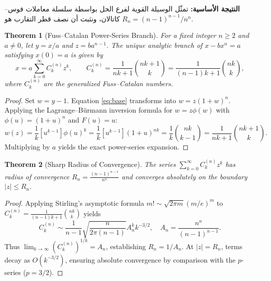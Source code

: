 \documentclass[11pt,a4paper]{article}
\newtheorem{theorem}{Theorem}[section]
\theoremstyle{definition}
\begin{document}
\begin{Arabic}
\begin{flushright}
\textbf{النتيجة الأساسية:} تمثّل الوسيلة القوية لفرع الحل بواسطة سلسلة معاملات فوس--كاتالان، ونثبت أن نصف قطر التقارب هو $R_n=(n-1)^{n-1}/n^n$.
\end{flushright}
\end{Arabic}

\begin{theorem}[Fuss--Catalan Power-Series Branch]
For a fixed integer $n \ge 2$ and $a \neq 0$, let $y = x/a$ and $z = b a^{n-1}$. The unique analytic branch of $x - b x^n = a$ satisfying $x(0) = a$ is given by
\begin{equation}
x = a \sum_{k=0}^{\infty} C_k^{(n)} z^k, \qquad C_k^{(n)} = \frac{1}{nk+1}\binom{nk+1}{k} = \frac{1}{(n-1)k+1}\binom{nk}{k},
\end{equation}
where $C_k^{(n)}$ are the generalized Fuss--Catalan numbers.
\end{theorem}

\begin{proof}
Set $w = y - 1$. Equation \eqref{eq:base} transforms into $w = z (1+w)^n$. Applying the Lagrange--B\"urmann inversion formula for $w = z \phi(w)$ with $\phi(u) = (1+u)^n$ and $F(u) = u$:
\begin{equation}
[z^k] w(z) = \frac{1}{k} [u^{k-1}] \phi(u)^k = \frac{1}{k} [u^{k-1}] (1+u)^{nk} = \frac{1}{k} \binom{nk}{k-1} = \frac{1}{nk+1} \binom{nk+1}{k}.
\end{equation}
Multiplying by $a$ yields the exact power-series expansion.
\end{proof}

\begin{theorem}[Sharp Radius of Convergence]
The series $\sum_{k=0}^{\infty} C_k^{(n)} z^k$ has radius of convergence $R_n = \frac{(n-1)^{n-1}}{n^n}$ and converges absolutely on the boundary $|z| \le R_n$.
\end{theorem}

\begin{proof}
Applying Stirling's asymptotic formula $m! \sim \sqrt{2\pi m} (m/e)^m$ to $C_k^{(n)} = \frac{1}{(n-1)k+1} \binom{nk}{k}$ yields
\begin{equation}
C_k^{(n)} \sim \frac{1}{n-1} \sqrt{\frac{n}{2\pi (n-1)}} A_n^k k^{-3/2}, \quad A_n = \frac{n^n}{(n-1)^{n-1}}.
\end{equation}
Thus $\lim_{k\to\infty} (C_k^{(n)})^{1/k} = A_n$, establishing $R_n = 1/A_n$. At $|z| = R_n$, terms decay as $O(k^{-3/2})$, ensuring absolute convergence by comparison with the $p$-series ($p = 3/2$).
\end{proof}
\end{document}
